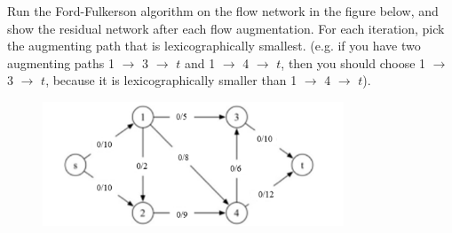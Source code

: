 \problem{}
Run the Ford-Fulkerson algorithm on the flow network in the figure below, and
show the residual network after each flow augmentation. For each iteration, pick
the augmenting path that is lexicographically smallest. (e.g. if you have two
augmenting paths 1 $\rightarrow$ 3 $\rightarrow$ $t$ and 1 $\rightarrow$ 4 $\rightarrow$ $t$, then you should choose 1 $\rightarrow$ 3 $\rightarrow$ $t$, because it is lexicographically smaller than 1 $\rightarrow$ 4 $\rightarrow$ $t$).


\begin{figure}[htbp]
    \centering
    \includegraphics[width=0.8\textwidth]{netflow.png}
    \end{figure} 


\solution{

}
\newpage